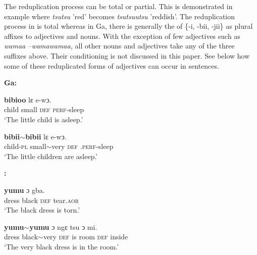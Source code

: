 \documentclass[output=paper,
modfonts
]{langscibook}
\begin{document}


The reduplication process can be total or partial. This is demonstrated in example  where \textit{tsutsu} 'red' becomes \textit{tsutsuutsu} 'reddish'. The reduplication process in  is total whereas in Ga, there is generally the  of \{-i, -bii, -jii\} as plural affixes to adjectives and nouns. With the exception of few adjectives such as \textit{wamaa –wamawamaa,} all other nouns and adjectives take any of the three suffixes above. Their conditioning is not discussed in this paper. See below how some of these reduplicated forms of adjectives can occur in sentences.

\ea\label{ex:caesar:20}
\textbf{Ga:}

 \textbf{{bibioo}} {lɛ} {e-wↄ.}\\
child small \textsc{def} \textsc{perf}-sleep\\
\glt  ‘The little child is asleep.’
\z



\ea\label{ex:caesar:21}
 \textbf{{bibii{$\sim$}bibii}} {lɛ} {e-wↄ.}\\
 child-\textsc{pl} small{$\sim$}very \textsc{def} .\textsc{perf}-sleep\\
\glt  ‘The little children are asleep.’
\z

\ea\label{ex:caesar:22}

\textbf{:}

 \textbf{{yumu}} {ɔ} {gba.} \\
 dress black \textsc{def} tear.\textsc{aor} \\
\glt ‘The black dress is torn.’
\z



\ea\label{ex:caesar:23}
 \textbf{{yumu{$\sim$}yumu}}  {ɔ} {ngɛ} {tsu} {ↄ} {mi}. \\
 dress black{$\sim$}very \textsc{def} is room \textsc{def} inside\\
\glt ‘The very black dress is in the room.’ 
\z
\end{document}
